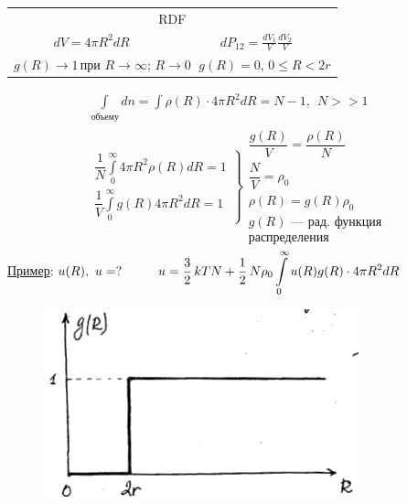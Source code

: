 \begin{lecture}
\begin{lecSection}[Введение]
	\begin{center}\begin{tabular}{cc}
		\multicolumn{2}{c}{RDF} \\
		$ dV = 4 \pi R^2 dR $ & $ d P_{12} = \frac{dV_1}{V} \frac{dV_2}{V} $ \\
		\multicolumn{2}{c}{$ g (R) \rightarrow 1\, \text{при } R \rightarrow \infty;\, R \rightarrow 0\,~~ g(R) = 0, \, 0 \leq R < 2r $} \\
	\end{tabular}\end{center}
	\begin{gather*}
	\int\limits_\text{объему} dn = \int \rho ( R ) \cdot 4 \pi R ^ { 2 } d R = N - 1, ~~ N >> 1 \\
	\left.\begin{array}{c}
	\dfrac{1}{N} \displaystyle \int\limits_0^\infty 4 \pi R^2 \rho (R) dR = 1 \\
	\dfrac { 1 } { V } \displaystyle \int\limits_0^\infty g ( R ) 4 \pi R ^ { 2 } d R = 1
	\end{array} \right \}
	\begin{array}{c}
		\dfrac{g (R)}{V} = \dfrac{\rho (R)}{N} \\
		\dfrac{N}{V} = \rho_0 \\
		\boxed{ \rho(R) = g(R) \rho_0 } \\
		g(R) \text{ --- рад. функция} \\ \text{распределения}
	\end{array}
	\end{gather*}
	\underline{Пример}: $ u(R),~ u=? \hspace*{1cm} u = \dfrac{3}{2}\, kTN + \dfrac{1}{2}\, N \rho_0 \displaystyle \int\limits_0^\infty u(R) g(R) \cdot 4\pi R^2 dR $
		\begin{figure}[h]
		\begin{minipage}{0.35\linewidth}
			\centering\includegraphics[width=\linewidth]{lecture_12/new_id_gas1}

\end{minipage}
\end{figure}
\end{lecSection}
\end{lecture}
